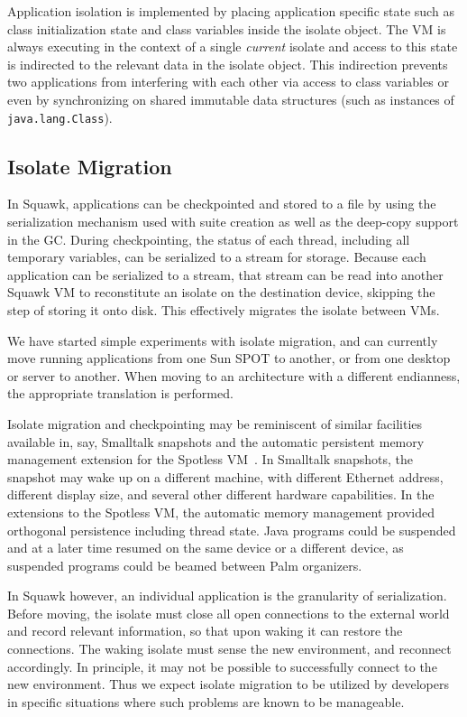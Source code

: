 \documentclass{sigplanconf}
\begin{document}
Application isolation is implemented by placing application specific
state such as class initialization state and class variables inside
the isolate object. 
The VM is always executing in the context of a single {\em current} 
isolate and access to this state is indirected to the relevant data in 
the isolate object.
This indirection prevents two applications from interfering
with each other via access to class variables or even by synchronizing
on shared immutable data structures (such as instances of
{\tt java.lang.Class}).


\subsection*{Isolate Migration}

In Squawk, applications can be checkpointed and stored to a file 
by using the serialization mechanism used with suite creation as 
well as the deep-copy support in the GC. 
During checkpointing, the status of each thread, including all 
temporary variables, can be serialized to a stream for storage.  
Because each application can be serialized to a stream, that stream
can be read into another Squawk VM to reconstitute an isolate 
on the destination device, skipping the step of storing it onto disk.  
This effectively migrates the isolate between VMs.

We have started simple experiments with isolate migration, and can 
currently move running applications from one Sun SPOT to another, 
or from one desktop or server to another. 
When moving to an architecture with a different endianness, the 
appropriate translation is performed. 

Isolate migration and checkpointing may be reminiscent of similar 
facilities available in, say, Smalltalk snapshots and the automatic
persistent memory management extension for the Spotless VM~\cite{Schn01}.  
In Smalltalk snapshots, the snapshot may wake up on a different machine, 
with different Ethernet address, different display size, and several 
other different hardware capabilities. 
In the extensions to the Spotless VM, the automatic memory management 
provided orthogonal persistence including thread state.  Java programs 
could be suspended and at a later time resumed on the same device or 
a different device, as suspended programs could be beamed between 
Palm organizers. 

In Squawk however, an individual application is the granularity of 
serialization.  Before moving, the isolate must close all open connections 
to the external world and record relevant information, so that upon 
waking it can restore the connections.  The waking isolate must sense  
the new environment, and reconnect accordingly.  In principle, it may 
not be possible to successfully connect to the new environment. 
Thus we expect isolate migration to be utilized by developers in specific
situations where such problems are known to be manageable.
\end{document}
